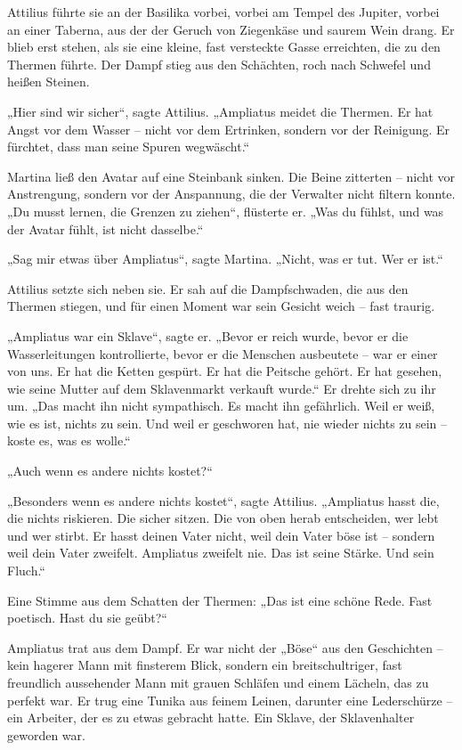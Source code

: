 \documentclass[
]{article}
\begin{document}
Attilius führte sie an der Basilika vorbei, vorbei am Tempel des Jupiter, vorbei an einer Taberna, aus der der Geruch von Ziegenkäse und saurem Wein drang. Er blieb erst stehen, als sie eine kleine, fast versteckte Gasse erreichten, die zu den Thermen führte. Der Dampf stieg aus den Schächten, roch nach Schwefel und heißen Steinen.

„Hier sind wir sicher``, sagte Attilius. „Ampliatus meidet die Thermen. Er hat Angst vor dem Wasser -- nicht vor dem Ertrinken, sondern vor der Reinigung. Er fürchtet, dass man seine Spuren wegwäscht.``

Martina ließ den Avatar auf eine Steinbank sinken. Die Beine zitterten -- nicht vor Anstrengung, sondern vor der Anspannung, die der Verwalter nicht filtern konnte. „Du musst lernen, die Grenzen zu ziehen``, flüsterte er. „Was du fühlst, und was der Avatar fühlt, ist nicht dasselbe.``

„Sag mir etwas über Ampliatus``, sagte Martina. „Nicht, was er tut. Wer er ist.``

Attilius setzte sich neben sie. Er sah auf die Dampfschwaden, die aus den Thermen stiegen, und für einen Moment war sein Gesicht weich -- fast traurig.

„Ampliatus war ein Sklave``, sagte er. „Bevor er reich wurde, bevor er die Wasserleitungen kontrollierte, bevor er die Menschen ausbeutete -- war er einer von uns. Er hat die Ketten gespürt. Er hat die Peitsche gehört. Er hat gesehen, wie seine Mutter auf dem Sklavenmarkt verkauft wurde.`` Er drehte sich zu ihr um. „Das macht ihn nicht sympathisch. Es macht ihn gefährlich. Weil er weiß, wie es ist, nichts zu sein. Und weil er geschworen hat, nie wieder nichts zu sein -- koste es, was es wolle.``

„Auch wenn es andere nichts kostet?{\kern0pt}``

„Besonders wenn es andere nichts kostet``, sagte Attilius. „Ampliatus hasst die, die nichts riskieren. Die sicher sitzen. Die von oben herab entscheiden, wer lebt und wer stirbt. Er hasst deinen Vater nicht, weil dein Vater böse ist -- sondern weil dein Vater zweifelt. Ampliatus zweifelt nie. Das ist seine Stärke. Und sein Fluch.``

Eine Stimme aus dem Schatten der Thermen: „Das ist eine schöne Rede. Fast poetisch. Hast du sie geübt?{\kern0pt}``

Ampliatus trat aus dem Dampf. Er war nicht der „Böse`` aus den Geschichten -- kein hagerer Mann mit finsterem Blick, sondern ein breitschultriger, fast freundlich aussehender Mann mit grauen Schläfen und einem Lächeln, das zu perfekt war. Er trug eine Tunika aus feinem Leinen, darunter eine Lederschürze -- ein Arbeiter, der es zu etwas gebracht hatte. Ein Sklave, der Sklavenhalter geworden war.
\end{document}
